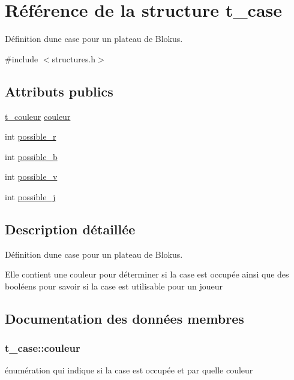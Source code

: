 \hypertarget{structt__case}{}\section{Référence de la structure t\+\_\+case}
\label{structt__case}


Définition d\textquotesingle{}une case pour un plateau de Blokus.  




{\ttfamily \#include $<$structures.\+h$>$}

\subsection*{Attributs publics}
\begin{DoxyCompactItemize}
\item 
\hyperlink{structures_8h_aa9f0f93fc533400ebe242cbb9986ef07}{t\+\_\+couleur} \hyperlink{structt__case_ae871a70afefeefaeb0003ed141d9d06b}{couleur}
\item 
int \hyperlink{structt__case_abfbade6a8fc1927fbdb8dca9c810b1c4}{possible\+\_\+r}
\item 
int \hyperlink{structt__case_aea7d8d23a697e3cd7b07a44e88f5781b}{possible\+\_\+b}
\item 
int \hyperlink{structt__case_a74e4a7aa37b5071dfc9a4da15d88cc7d}{possible\+\_\+v}
\item 
int \hyperlink{structt__case_a7ba4c0e092015a53344116cc2e54f2dc}{possible\+\_\+j}
\end{DoxyCompactItemize}


\subsection{Description détaillée}
Définition d\textquotesingle{}une case pour un plateau de Blokus. 

Elle contient une couleur pour déterminer si la case est occupée ainsi que des booléens pour savoir si la case est utilisable pour un joueur 

\subsection{Documentation des données membres}
\subsubsection[{\texorpdfstring{couleur}{couleur}}]{ t\+\_\+case\+::couleur}\hypertarget{structt__case_ae871a70afefeefaeb0003ed141d9d06b}{}\label{structt__case_ae871a70afefeefaeb0003ed141d9d06b}
énumération qui indique si la case est occupée et par quelle couleur 

